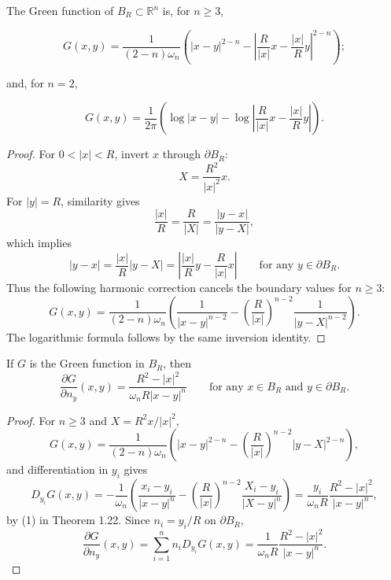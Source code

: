 \begin{theorem}\label{hanlin:thm-green-ball}
The Green function of $B_R\subset\mathbb{R}^n$ is, for $n\ge3$,

\[
G(x,y)=\frac{1}{(2-n)\omega_n}\left(|x-y|^{2-n}-\left|\frac{R}{|x|}x-\frac{|x|}{R}y\right|^{2-n}\right);
\]

and, for $n=2$,

\[
G(x,y)=\frac{1}{2\pi}\left(\log |x-y|-\log \left|\frac{R}{|x|}x-\frac{|x|}{R}y\right|\right).
\]
\end{theorem}

\begin{proof}
\sketch For $0<|x|<R$, invert $x$ through $\partial B_R$:
\[
X=\frac{R^2}{|x|^2}x.
\]
For $|y|=R$, similarity gives
\[
\frac{|x|}{R}=\frac{R}{|X|}=\frac{|y-x|}{|y-X|},
\]
which implies
\begin{equation}
|y-x|=\frac{|x|}{R}|y-X|=\left|\frac{|x|}{R}y-\frac{R}{|x|}x\right|
\qquad \text{for any } y\in \partial B_R.
\tag{1}
\end{equation}
Thus the following harmonic correction cancels the boundary values for $n\ge3$:
\[
G(x,y)=\frac{1}{(2-n)\omega_n}\left(\frac{1}{|x-y|^{n-2}}-\left(\frac{R}{|x|}\right)^{n-2}\frac{1}{|y-X|^{n-2}}\right).
\]
The logarithmic formula follows by the same inversion identity.
\end{proof}

\begin{corollary}\label{hanlin:cor-green-normal-derivative}
If $G$ is the Green function in $B_R$, then
\[
\frac{\partial G}{\partial n_y}(x,y)=\frac{R^2-|x|^2}{\omega_n R|x-y|^n}
\qquad \text{for any } x\in B_R \text{ and } y\in \partial B_R.
\]
\end{corollary}
\begin{proof}
\sketch For $n\ge3$ and $X=R^2x/|x|^2$,
\[
G(x,y)=\frac{1}{(2-n)\omega_n}\left(|x-y|^{2-n}-\left(\frac{R}{|x|}\right)^{n-2}|y-X|^{2-n}\right),
\]
and differentiation in $y_i$ gives
\[
D_{y_i}G(x,y)=-\frac{1}{\omega_n}\left(\frac{x_i-y_i}{|x-y|^n}-\left(\frac{R}{|x|}\right)^{n-2}\frac{X_i-y_i}{|X-y|^n}\right)
=\frac{y_i}{\omega_n R}\frac{R^2-|x|^2}{|x-y|^n},
\]
by (1) in Theorem 1.22. Since $n_i=y_i/R$ on $\partial B_R$,
\[
\frac{\partial G}{\partial n_y}(x,y)=\sum_{i=1}^n n_iD_{y_i}G(x,y)=\frac{1}{\omega_n R}\frac{R^2-|x|^2}{|x-y|^n}.
\]
\end{proof}

